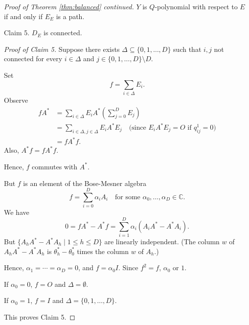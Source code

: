 \documentclass[
]{book}
\theoremstyle{definition}
\theoremstyle{definition}
\theoremstyle{definition}
\theoremstyle{definition}
\theoremstyle{remark}
\begin{document}
\begin{proof}[Proof of Theorem \ref{thm:balanced} continued]
\(Y\) is \(Q\)-polynomial with respect to \(E\) if and only if \(E_E\) is a path.

Claim 5. \(D_E\) is connected.

\emph{Proof of Claim 5.}
Suppose there exists \(\Delta \subseteq \{0,1,\ldots, D\}\) such that \(i,j\) not connected for every \(i\in \Delta\) and \(j\in \{0,1,\ldots, D\}\setminus D\).

Set
\[f = \sum_{i\in \Delta}E_i.\]
Observe
\begin{align}
fA^* & = \sum_{i\in \Delta} E_i A^* \left(\sum_{j=0}^D E_j\right)\\
& = \sum_{i\in \Delta, j\in \Delta}E_iA^*E_j \quad \text{(since $E_iA^*E_j=O$ if $q^1_{ij}=0$)}\\
& = fA^*f.
\end{align}
Also, \(A^*f = fA^*f\).

Hence, \(f\) commutes with \(A^*\).

But \(f\) is an element of the Bose-Mesner algebra
\[f = \sum_{i=0}^D \alpha_i A_i \quad \text{for some $\alpha_0, \ldots, \alpha_D\in \mathbb{C}$}.\]
We have
\[0 = fA^*-A^*f = \sum_{i=1}^D \alpha_i(A_iA^*- A^*A_i).\]
But \(\{A_hA^* - A^*A_h \mid 1\leq h\leq D\}\) are linearly independent.
(The column \(w\) of \(A_hA^*-A^*A_h\) is \(\theta^*_h - \theta^*_0\) times the column \(w\) of \(A_h\).)

Hence, \(\alpha_1 = \cdots = \alpha_D = 0\), and \(f = \alpha_0 I\). Since \(f^2 = f\), \(\alpha_0\) or \(1\).

If \(\alpha_0 = 0\), \(f=O\) and \(\Delta = \emptyset\).

If \(\alpha_0 = 1\), \(f=I\) and \(\Delta = \{0, 1, \ldots, D\}\).

This proves Claim 5.

\end{proof}
\end{document}
